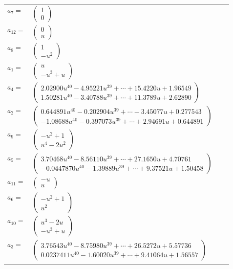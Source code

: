 \documentclass[1p]{elsarticle_modified}
\theoremstyle{definition}
\begin{document}
\begin{tabular}{m{7pt} m{180pt} m{7pt} m{180pt} }
\flushright $a_{7}=$&$\begin{pmatrix}1\\0\end{pmatrix}$ \\
\flushright $a_{12}=$&$\begin{pmatrix}0\\u\end{pmatrix}$ \\
\flushright $a_{8}=$&$\begin{pmatrix}1\\- u^2\end{pmatrix}$ \\
\flushright $a_{1}=$&$\begin{pmatrix}u\\- u^3+u\end{pmatrix}$ \\
\flushright $a_{4}=$&$\begin{pmatrix}2.02900 u^{40}-4.95221 u^{39}+\cdots+15.4220 u+1.96549\\1.50281 u^{40}-3.40788 u^{39}+\cdots+11.3789 u+2.62890\end{pmatrix}$ \\
\flushright $a_{2}=$&$\begin{pmatrix}0.644891 u^{40}-0.202904 u^{39}+\cdots-3.45077 u+0.277543\\-1.08688 u^{40}-0.397073 u^{39}+\cdots+2.94691 u+0.644891\end{pmatrix}$ \\
\flushright $a_{9}=$&$\begin{pmatrix}- u^2+1\\u^4-2 u^2\end{pmatrix}$ \\
\flushright $a_{5}=$&$\begin{pmatrix}3.70468 u^{40}-8.56110 u^{39}+\cdots+27.1650 u+4.70761\\-0.0447870 u^{40}-1.39889 u^{39}+\cdots+9.37521 u+1.50458\end{pmatrix}$ \\
\flushright $a_{11}=$&$\begin{pmatrix}- u\\u\end{pmatrix}$ \\
\flushright $a_{6}=$&$\begin{pmatrix}- u^2+1\\u^2\end{pmatrix}$ \\
\flushright $a_{10}=$&$\begin{pmatrix}u^3-2 u\\- u^3+u\end{pmatrix}$ \\
\flushright $a_{3}=$&$\begin{pmatrix}3.76543 u^{40}-8.75980 u^{39}+\cdots+26.5272 u+5.57736\\0.0237411 u^{40}-1.60020 u^{39}+\cdots+9.41064 u+1.56557\end{pmatrix}$\\&\end{tabular}
\end{document}
